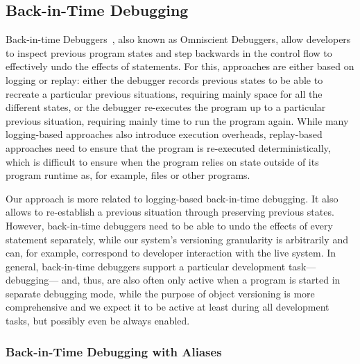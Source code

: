 \subsection{Back-in-Time Debugging}

Back-in-time Debuggers~\cite{Lewis2003BIT}, also known as Omniscient Debuggers, allow developers to inspect previous program states and step backwards in the control flow to effectively undo the effects of statements.
For this, approaches are either based on logging or replay: either the debugger records previous states to be able to recreate a particular previous situations, requiring mainly space for all the different states, or the debugger re-executes the program up to a particular previous situation, requiring mainly time to run the program again.
While many logging-based approaches also introduce execution overheads, replay-based approaches need to ensure that the program is re-executed deterministically, which is difficult to ensure when the program relies on state outside of its program runtime as, for example, files or other programs.

Our approach is more related to logging-based back-in-time debugging.
It also allows to re-establish a previous situation through preserving previous states.
However, back-in-time debuggers need to be able to undo the effects of every statement separately, while our system's versioning granularity is arbitrarily and can, for example, correspond to developer interaction with the live system.
In general, back-in-time debuggers support a particular development task---debugging--- and, thus, are also often only active when a program is started in separate debugging mode, while the purpose of object versioning is more comprehensive and we expect it to be active at least during all development tasks, but possibly even be always enabled.

\subsubsection{Back-in-Time Debugging with Aliases}

